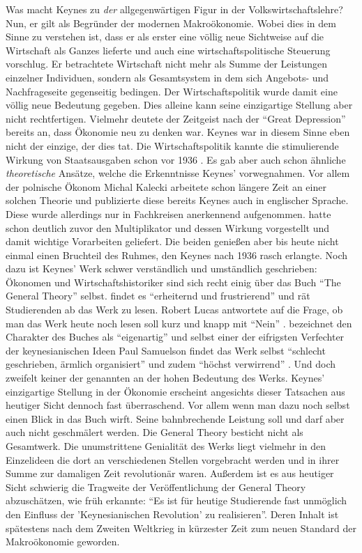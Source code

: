 Was macht Keynes zu \textit{der} allgegenwärtigen Figur in der Volkswirtschaftslehre? Nun, er gilt als Begründer der modernen Makroökonomie. Wobei dies in dem Sinne zu verstehen ist, dass er als erster eine völlig neue Sichtweise auf die Wirtschaft als Ganzes lieferte und auch eine wirtschaftspolitische Steuerung vorschlug. Er betrachtete Wirtschaft nicht mehr als Summe der Leistungen einzelner Individuen, sondern als Gesamtsystem in dem sich Angebots- und Nachfrageseite gegenseitig bedingen. Der Wirtschaftspolitik wurde damit eine völlig neue Bedeutung gegeben. Dies alleine kann seine einzigartige Stellung aber nicht rechtfertigen. Vielmehr deutete der Zeitgeist nach der "`Great Depression"' bereits an, dass Ökonomie neu zu denken war. Keynes war in diesem Sinne eben nicht der einzige, der dies tat. Die Wirtschaftspolitik kannte die stimulierende Wirkung von Staatsausgaben schon vor 1936 \parencite{Fishback2010}. Es gab aber auch schon ähnliche \textit{theoretische} Ansätze, welche die Erkenntnisse Keynes' vorwegnahmen. Vor allem der polnische Ökonom Michal Kalecki arbeitete schon längere Zeit an einer solchen Theorie und publizierte diese \parencite{Kalecki1935} bereits Keynes auch in englischer Sprache. Diese wurde allerdings nur in Fachkreisen anerkennend aufgenommen. \textcite{Kahn1931} hatte schon deutlich zuvor den Multiplikator und dessen Wirkung vorgestellt und damit wichtige Vorarbeiten geliefert. Die beiden genießen aber bis heute nicht einmal einen Bruchteil des Ruhmes, den Keynes nach 1936 rasch erlangte. Noch dazu ist Keynes' Werk schwer verständlich und umständlich geschrieben: Ökonomen und Wirtschaftshistoriker sind sich recht einig über das Buch "`The General Theory"' selbst. \textcite [S. 31]{Mankiw2006} findet es "`erheiternd und frustrierend"' und rät Studierenden ab das Werk zu lesen. Robert Lucas antwortete auf die Frage, ob man das Werk heute noch lesen soll kurz und knapp mit "`Nein"' \parencite{Lucas2013}. \textcite[S. 429]{Rosner2012} bezeichnet den Charakter des Buches als "`eigenartig"' und selbst einer der eifrigsten Verfechter der keynesianischen Ideen Paul Samuelson findet das Werk selbst "`schlecht geschrieben, ärmlich organisiert"' und zudem "`höchst verwirrend"' \parencite[S. 190]{Samuelson1946}. Und doch zweifelt keiner der genannten an der hohen Bedeutung des Werks. Keynes' einzigartige Stellung in der Ökonomie erscheint angesichts dieser Tatsachen aus heutiger Sicht dennoch fast überraschend. Vor allem wenn man dazu noch selbst einen Blick in das Buch wirft. Seine bahnbrechende Leistung soll und darf aber auch nicht geschmälert werden. Die General Theory besticht nicht als Gesamtwerk. Die unumstrittene Genialität des Werks liegt vielmehr in den Einzelideen die dort an verschiedenen Stellen vorgebracht werden und in ihrer Summe zur damaligen Zeit revolutionär waren. Außerdem ist es aus heutiger Sicht schwierig die Tragweite der Veröffentlichung der General Theory abzuschätzen, wie \textcite[S. 187]{Samuelson1946} früh erkannte: "`Es ist für heutige Studierende fast unmöglich  den Einfluss der 'Keynesianischen Revolution' zu realisieren"'. Deren Inhalt ist spätestens nach dem Zweiten Weltkrieg in kürzester Zeit zum neuen Standard der Makroökonomie geworden. 

